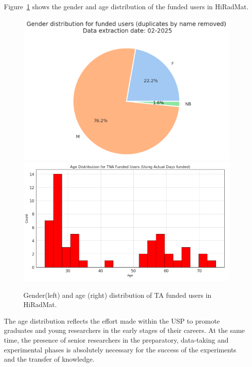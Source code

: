 
Figure~\ref{fig:gender_distr_hiradmat} shows the gender and age distribution of the funded users in HiRadMat. 
\begin{figure}[!h]
    \centering
    \includegraphics[width=0.48\linewidth]{graphics/gender_distr_hiradmat.png}
    \includegraphics[width=0.48\linewidth]{graphics/age_distr_hiradmat.png}
    \caption{Gender(left) and age (right) distribution of TA funded users in HiRadMat.}
    \label{fig:gender_distr_hiradmat}
\end{figure}
The age distribution reflects the effort made within the USP to promote graduates and young researchers in the early stages of their careers. At the same time, the presence of senior researchers in the preparatory, data-taking and experimental phases is absolutely necessary for the success of the experiments and the transfer of knowledge. 

